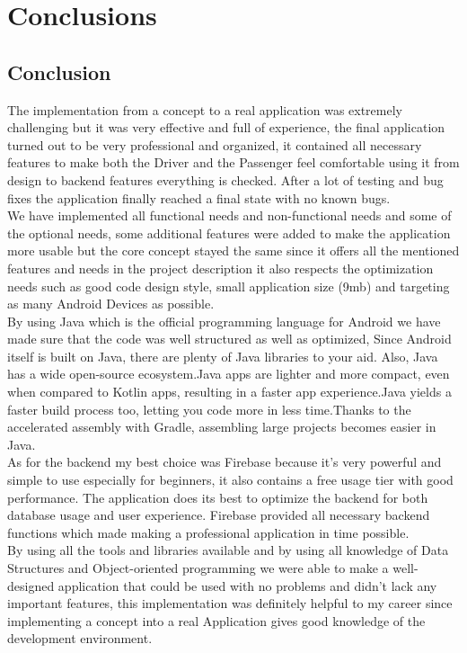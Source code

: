 \chapter{Conclusions}\label{chap:conclusions}

\section*{}
\section{Conclusion}
The implementation from a concept to a real application was extremely challenging but it was very effective and full of experience, the final application turned out to be very professional and organized, it contained all necessary features to make both the Driver and the Passenger feel comfortable using it from design to backend features everything is checked. After a lot of testing and bug fixes the application finally reached a final state with no known bugs. 
\\  We have implemented all functional needs and non-functional needs and some of the optional needs, some additional features were added to make the application more usable but the core concept stayed the same since it offers all the mentioned features and needs in the project description it also respects the optimization needs such as good code design style, small application size (9mb) and targeting as many Android Devices as possible.
\\ By using Java which is the official programming language for Android we have made sure that the code was well structured as well as optimized, Since Android itself is built on Java, there are plenty of Java libraries to your aid. Also, Java has a wide open-source ecosystem.Java apps are lighter and more compact, even when compared to Kotlin apps, resulting in a faster app experience.Java yields a faster build process too, letting you code more in less time.Thanks to the accelerated assembly with Gradle, assembling large projects becomes easier in Java.
\\ As for the backend my best choice was Firebase because it’s very powerful and simple to use especially for beginners, it also contains a free usage tier with good performance. The application does its best to optimize the backend for both database usage and user experience. Firebase provided all necessary backend functions which made making a professional application in time possible. 
\\  By using all the tools and libraries available and by using all knowledge of Data Structures and Object-oriented programming we were able to make a well-designed application that could be used with no problems and didn’t lack any important features, this implementation was definitely helpful to my career since implementing a concept into a real Application gives good knowledge of the development environment. 

